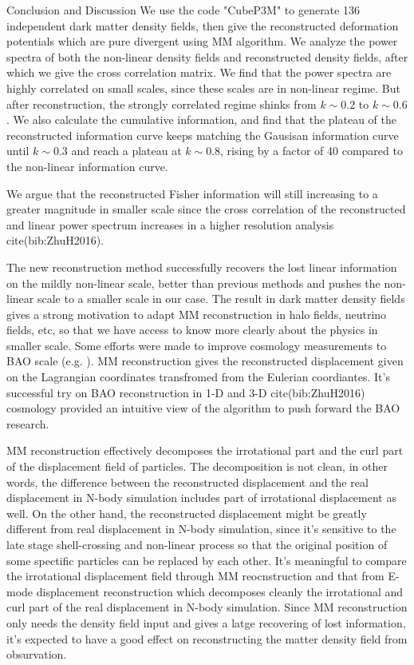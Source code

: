 \begin{section}{Conclusion and Discussion}
 \label{sec:conclusion}
    We use the code "CubeP3M" to generate 136 independent dark matter density fields, 
then give the reconstructed deformation potentials which are pure divergent using MM 
algorithm. We analyze the power spectra of both the non-linear density fields and 
reconstructed density fields, after which we give the cross correlation matrix. We find that the power 
spectra are highly correlated on small scales, since these scales are in non-linear 
regime. But after reconstruction, the strongly correlated regime shinks from $k\sim0.2$ 
to $k\sim0.6$. We also calculate the cumulative information, and find that the plateau 
of the reconstructed information curve keeps matching the Gausisan information curve until 
$k \sim 0.3$ and reach a plateau at $k \sim 0.8$, rising by a factor of 40 compared to the 
non-linear information curve.

   We argue that the reconstructed Fisher information will still increasing to a greater magnitude in smaller scale 
since the cross correlation of the reconstructed and linear power spectrum increases 
in a higher resolution analysis cite(bib:ZhuH2016).

   The new reconstruction method successfully recovers the lost linear information on 
the mildly non-linear scale, better than previous methods 
\cite{bib:Mark2006,bib:Mark2009,bib:Zhang2011,bib:Yu2012,bib:Mark2014} and pushes the 
non-linear scale to a smaller scale in our case. The result in dark matter density fields 
gives a strong motivation to adapt MM reconstruction in halo fields, neutrino fields, etc, so that 
we have access to know more clearly about the physics in smaller scale. Some efforts were 
made to improve cosmology measurements to BAO scale (e.g. \cite{bib:Daniel2007,bib:Martin2015}). 
MM reconstruction gives the reconstructed displacement given on the Lagrangian coordinates transfromed from the 
Eulerian coordiantes. It's successful try on BAO reconstruction in 1-D 
\cite{bib:Zhu2016} and 3-D cite(bib:ZhuH2016) cosmology provided an intuitive view of the algorithm 
to push forward the BAO research.

   MM reconstruction effectively decomposes the irrotational part and the curl part of the displacement 
field of particles. The decomposition is not clean, in other words, the difference between the reconstructed 
displacement and the real displacement in N-body simulation includes part of irrotational displacement as well. 
On the other hand, the reconstructed displacement might be greatly different from real displacement in N-body 
simulation, since it's sensitive to the late stage shell-crossing and non-linear process so that the original 
position of some spectific particles can be replaced by each other. It's meaningful to compare the irrotational 
displacement field through MM reocnstruction and that from E-mode displacement reconstruction \cite{bib:Yu2016} 
which decomposes cleanly the irrotational and curl part of the real displacement in N-body simulation. 
Since MM reconstruction only needs the density field input and gives a latge recovering of lost information, 
it's expected to have a good effect on reconstructing the matter density field from obsurvation.
\end{section}
